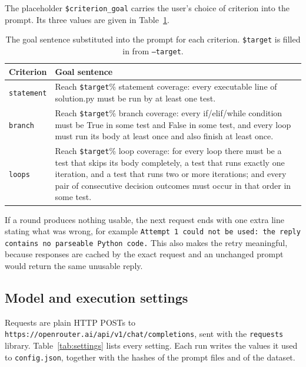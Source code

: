 \documentclass[11pt,a4paper]{article}
\begin{document}
The placeholder \texttt{\$criterion\_goal} carries the user's choice of criterion into the prompt. Its three
values are given in Table~\ref{tab:goals}.

\begin{table}[htbp]
\centering
\small
\caption{The goal sentence substituted into the prompt for each criterion. \texttt{\$target} is filled in from
\texttt{--target}.}
\label{tab:goals}
\begin{tabular}{@{}p{1.6cm}p{12.4cm}@{}}
\toprule
\textbf{Criterion} & \textbf{Goal sentence} \\
\midrule
\texttt{statement} & Reach \texttt{\$target}\% statement coverage: every executable line of solution.py must be
run by at least one test. \\
\addlinespace
\texttt{branch} & Reach \texttt{\$target}\% branch coverage: every if/elif/while condition must be True in some
test and False in some test, and every loop must run its body at least once and also finish at least once. \\
\addlinespace
\texttt{loops} & Reach \texttt{\$target}\% loop coverage: for every loop there must be a test that skips its
body completely, a test that runs exactly one iteration, and a test that runs two or more iterations; and
every pair of consecutive decision outcomes must occur in that order in some test. \\
\bottomrule
\end{tabular}
\end{table}

If a round produces nothing usable, the next request ends with one extra line stating what was wrong, for
example \texttt{Attempt 1 could not be used: the reply contains no parseable Python code.} This also makes the
retry meaningful, because responses are cached by the exact request and an unchanged prompt would return the
same unusable reply.

\subsection{Model and execution settings}

Requests are plain HTTP POSTs to \texttt{https://openrouter.ai/api/v1/chat/\allowbreak completions}, sent with
the \texttt{requests} library. Table~\ref{tab:settings} lists every setting. Each run writes the values it
used to \texttt{config.json}, together with the hashes of the prompt files and of the dataset.
\end{document}
